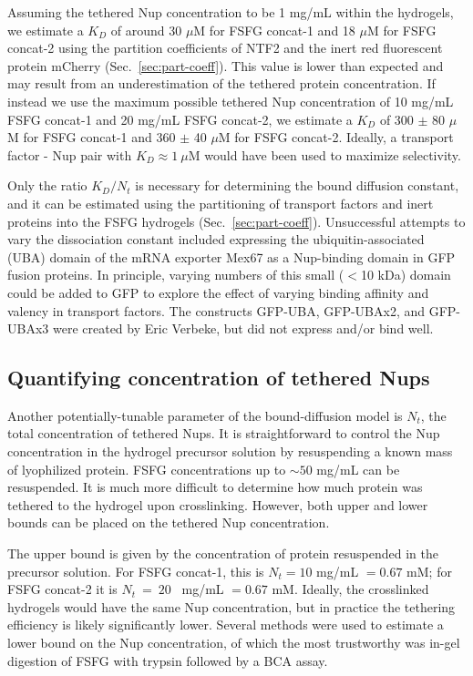  Assuming the tethered Nup concentration to be 1 mg/mL within the hydrogels, we estimate a $K_D$ of around 30 $\mu$M for FSFG concat-1 and 18 $\mu$M for FSFG concat-2 using the partition coefficients of NTF2 and the inert red fluorescent protein mCherry (Sec.~\ref{sec:part-coeff}).  This value is lower than expected and may result from an underestimation of the tethered protein concentration.  If instead we use the maximum possible tethered Nup concentration of 10 mg/mL FSFG concat-1 and 20 mg/mL FSFG concat-2, we estimate a $K_D$ of  300 $\pm$ 80 $\mu$M for FSFG concat-1 and 360 $\pm$ 40 $\mu$M for FSFG concat-2.  Ideally, a transport factor - Nup pair with $K_D \approx 1\ \mu$M would have been used to maximize selectivity.

Only the ratio $K_D/N_t$ is necessary for determining the bound diffusion constant, and it can be estimated using the partitioning of transport factors and inert proteins into the FSFG hydrogels (Sec.~\ref{sec:part-coeff}).  Unsuccessful attempts to vary the dissociation constant included expressing the ubiquitin-associated (UBA) domain of the mRNA exporter Mex67 as a Nup-binding domain in GFP fusion proteins.  In principle, varying numbers of this small ($<$10 kDa) domain could be added to GFP to explore the effect of varying binding affinity and valency in transport factors.  The constructs GFP-UBA, GFP-UBAx2, and GFP-UBAx3 were created by Eric Verbeke, but did not express and/or bind well.


\subsection{Quantifying concentration of tethered Nups}
\label{sec:Nup-conc}

Another potentially-tunable parameter of the bound-diffusion model is $N_t$, the total concentration of tethered Nups.  It is straightforward to control the Nup concentration in the hydrogel precursor solution by resuspending a known mass of lyophilized protein.  FSFG concentrations up to $\sim 50$ mg/mL can be resuspended.  It is much more difficult to determine how much protein was tethered to the hydrogel upon crosslinking.  However, both upper and lower bounds can be placed on the tethered Nup concentration.

The upper bound is given by the concentration of protein resuspended in the precursor solution.  For FSFG concat-1, this is $N_t = 10$ mg/mL $= 0.67$ mM; for FSFG concat-2 it is $N_t~=~20$~ mg/mL $= 0.67$ mM.  Ideally, the crosslinked hydrogels would have the same Nup concentration, but in practice the tethering efficiency is likely significantly lower.  Several methods were used to estimate a lower bound on the Nup concentration, of which the most trustworthy was in-gel digestion of FSFG with trypsin followed by a BCA assay.

